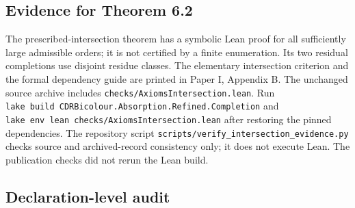\documentclass[english,11pt,a4paper]{article}
\begin{document}
\subsection{Evidence for Theorem 6.2}\label{evidence-for-theorem-6.2}

The prescribed-intersection theorem has a symbolic Lean proof for all sufficiently large admissible orders; it is not certified by a finite enumeration. Its two residual completions use disjoint residue classes. The elementary intersection criterion and the formal dependency guide are printed in Paper I, Appendix B. The unchanged source archive includes \texttt{checks/\allowbreak{}Axioms\allowbreak{}Intersection.\allowbreak{}lean}. Run \texttt{lake\ build\ CDRBicolour.\allowbreak{}Absorption.\allowbreak{}Refined.\allowbreak{}Completion} and \texttt{lake\ env\ lean\ checks/\allowbreak{}Axioms\allowbreak{}Intersection.\allowbreak{}lean} after restoring the pinned dependencies. The repository script \texttt{scripts/\allowbreak{}verify\_\allowbreak{}intersection\_\allowbreak{}evidence.\allowbreak{}py} checks source and archived-record consistency only; it does not execute Lean. The publication checks did not rerun the Lean build.

\subsection{Declaration-level audit}\label{declaration-level-audit}
\end{document}
